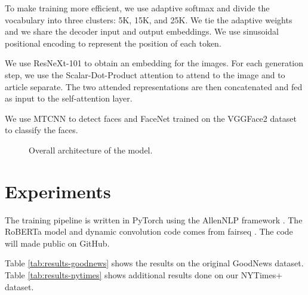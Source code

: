 \documentclass[10pt,twocolumn,letterpaper]{article}
\begin{document}
To make training more efficient, we use adaptive softmax
\cite{Grave2016EfficientSA} and divide the vocabulary into three clusters: 5K,
15K, and 25K. We tie the adaptive weights and we share the decoder input and
output embeddings. We use sinusoidal positional encoding
\cite{Vaswani2017AttentionIA} to represent the position of each token.

We use ResNeXt-101 \cite{Xie2016AggregatedRT} to obtain an embedding for
the images. For each generation step, we use the Scalar-Dot-Product attention
\cite{Vaswani2017AttentionIA} to attend to the image and to article separate.
The two attended representations are then concatenated and fed as input to
the self-attention layer.

We use MTCNN \cite{Zhang2016JointFD} to detect faces and FaceNet
\cite{Schroff2015FaceNetAU} trained on the VGGFace2 dataset
\cite{Cao2017VGGFace2AD}
to classify the faces.

\begin{figure}[t]
   \begin{center}
   \fbox{\rule{0pt}{2in} \rule{.9\linewidth}{0pt}}
   \end{center}
      \caption{Overall architecture of the model.}
   \label{fig:short}
   \end{figure}

\section{Experiments}

The training pipeline is written in PyTorch \cite{Paszke2017Automatic} using
the AllenNLP framework \cite{Gardner2017AllenNLP}. The RoBERTa model and
dynamic convolution code comes from fairseq \cite{Ott2019Fairseq}. The code
will made public on GitHub.

Table \ref{tab:results-goodnews} shows the results on the original GoodNews
dataset. Table \ref{tab:results-nytimes} shows additional results done on
our NYTimes+ dataset.
\end{document}
